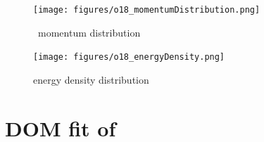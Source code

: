\begin{figure}[H]
    \centering
    \texttt{[image: figures/o18\_momentumDistribution.png]}
    \caption{\oEight\ momentum distribution}
    \label{DOMFitData_o18_momentumDistribution}
\end{figure}

\begin{figure}[H]
    \centering
    \texttt{[image: figures/o18\_energyDensity.png]}
    \caption{\oEight energy density distribution}
    \label{DOMFitData_o18_energyDensity}
\end{figure}

\section{DOM fit of \caForty}

\label{ca40DOMOutput}
